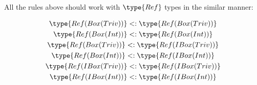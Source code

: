 \documentclass{article}
\newcommand\subtype{\mathrel{<:}}
\begin{document}
\medskip

All the rules above should work with $\type{Ref}$ types in the similar manner:

\begin{gather*}
  \type{Ref(Box(Triv))}  \subtype \type{Ref(Box(Triv))}\\
  \type{Ref(Box(Int))}   \subtype \type{Ref(Box(Int))}\\
  \type{Ref(Box(Triv))}  \subtype \type{Ref(IBox(Triv))}\\
  \type{Ref(Box(Int))}   \subtype \type{Ref(IBox(Int))}\\
  \type{Ref(IBox(Triv))} \subtype \type{Ref(IBox(Triv))}\\
  \type{Ref(IBox(Int))}  \subtype \type{Ref(IBox(Int))}
\end{gather*}

\end{document}
